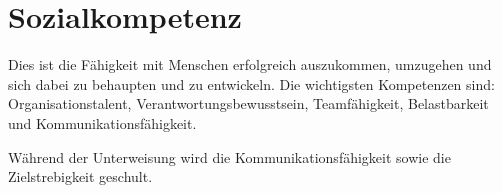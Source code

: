\section{Sozialkompetenz}
Dies ist die Fähigkeit mit Menschen erfolgreich auszukommen, umzugehen und sich dabei zu behaupten und zu entwickeln. Die wichtigsten Kompetenzen sind: Organisationstalent, Verantwortungsbewusstsein, Teamfähigkeit, Belastbarkeit und Kommunikationsfähigkeit. 
\par
Während der Unterweisung wird die Kommunikationsfähigkeit sowie die Zielstrebigkeit geschult. 
